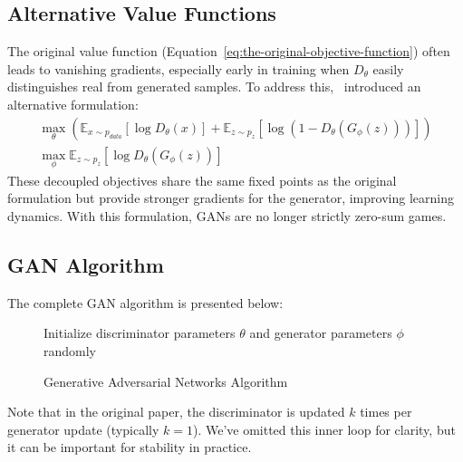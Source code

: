 \subsection{Alternative Value Functions}%
\label{sec:two-value}
The original value function (Equation~\ref{eq:the-original-objective-function}) often leads to vanishing gradients, especially early in training when $D_\theta$ easily distinguishes real from generated samples. To address this,~\cite{ref:goodfellow-original} introduced an alternative formulation:
\begin{align}
	\label{eq:second-value-function}
	\max_{\theta} \left( \mathbb{E}_{x \sim p_{data}}[\log D_\theta(x)] + \mathbb{E}_{z \sim p_z}[\log(1 - D_\theta(G_\phi(z)))] \right) \\
	\max_{\phi} \mathbb{E}_{z \sim p_z}[\log D_\theta(G_\phi(z))]
\end{align}
These decoupled objectives share the same fixed points as the original formulation but provide stronger gradients for the generator, improving learning dynamics. With this formulation, GANs are no longer strictly zero-sum games.
\subsection{GAN Algorithm}
The complete GAN algorithm is presented below:
\begin{figure}[H] \centering
	\begin{minipage}{0.95\linewidth}
		\begin{algorithm}[H]
			\SetAlgoLined
			Initialize discriminator parameters $\theta$ and generator parameters $\phi$ randomly\;
			\caption{Generative Adversarial Networks Algorithm}
			\label{algo:main-algo}
		\end{algorithm}
	\end{minipage}
\end{figure}
Note that in the original paper, the discriminator is updated $k$ times per generator update (typically $k=1$). We've omitted this inner loop for clarity, but it can be important for stability in practice.
